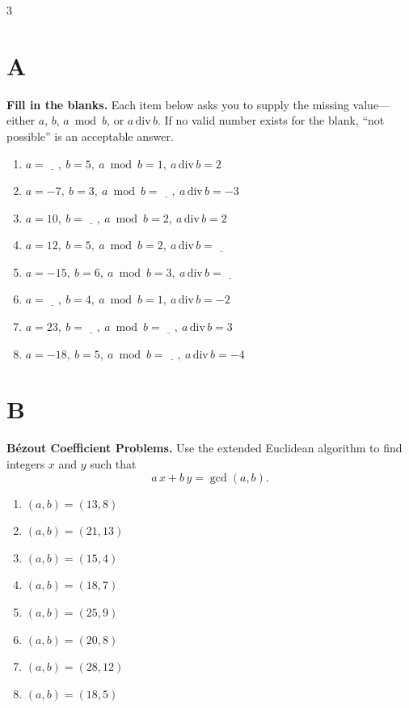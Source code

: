 \documentclass[9pt]{article}
\begin{document}
\small
\begin{multicols}{3}
\section*{A}
\textbf{Fill in the blanks.} Each item below asks you to supply the missing value—either \(a\), \(b\), \(a \bmod b\), or \(a \,\mathrm{div}\, b\). If no valid number exists for the blank, “not possible” is an acceptable answer.

\begin{enumerate}
    \item $a = \underline{\quad},\ b = 5,\ a \bmod b = 1,\ a \,\mathrm{div}\, b = 2$ 
    \item $a = -7,\ b = 3,\ a \bmod b = \underline{\quad},\ a \,\mathrm{div}\, b = -3$ 
    \item $a = 10,\ b = \underline{\quad},\ a \bmod b = 2,\ a \,\mathrm{div}\, b = 2$ 
    \item $a = 12,\ b = 5,\ a \bmod b = 2,\ a \,\mathrm{div}\, b = \underline{\quad}$ 
    \item $a = -15,\ b = 6,\ a \bmod b = 3,\ a \,\mathrm{div}\, b = \underline{\quad}$ 
    \item $a = \underline{\quad},\ b = 4,\ a \bmod b = 1,\ a \,\mathrm{div}\, b = -2$ 
    \item $a = 23,\ b = \underline{\quad},\ a \bmod b = \underline{\quad},\ a \,\mathrm{div}\, b = 3$ 
    \item $a = -18,\ b = 5,\ a \bmod b = \underline{\quad},\ a \,\mathrm{div}\, b = -4$ 
\end{enumerate}
\section*{B}
\textbf{Bézout Coefficient Problems.}  Use the extended Euclidean algorithm to find integers \(x\) and \(y\) such that
\[
a\,x + b\,y = \gcd(a,b).
\]
\begin{enumerate}
    \item \((a,b) = (13, 8)\)
    \item \((a,b) = (21, 13)\)
    \item \((a,b) = (15, 4)\)
    \item \((a,b) = (18, 7)\)
    \item \((a,b) = (25, 9)\)
    \item \((a,b) = (20, 8)\)
    \item \((a,b) = (28, 12)\)
    \item \((a,b) = (18, 5)\)
\end{enumerate}


\end{multicols}
\end{document}
